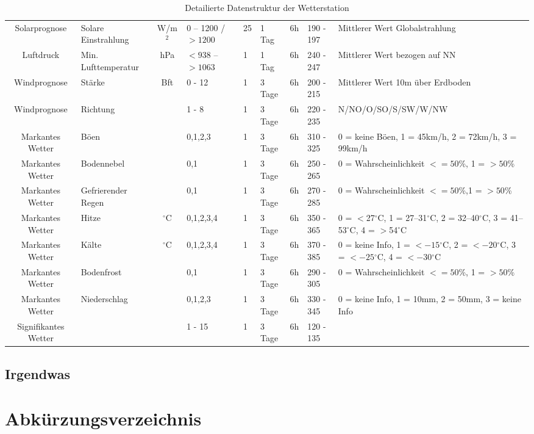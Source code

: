 \begin{sidewaystable}[h]
{{\begin{tabular}{| c | l | c | l | l | l | l | l | l |}
Solarprognose & Solare Einstrahlung & W/m$^2$ &  0 – 1200 / $>1200$ & 25 & 1 Tag & 6h & 190 - 197 & Mittlerer Wert Globalstrahlung\\
Luftdruck & Min. Lufttemperatur & hPa &  $<938$ – $>1063$ & 1 & 1 Tag & 6h & 240 - 247 & Mittlerer Wert bezogen auf NN\\
Windprognose & Stärke & Bft &  0 - 12 & 1 & 3 Tage & 6h & 200 - 215 & Mittlerer Wert 10m über Erdboden\\
Windprognose & Richtung &  &  1 - 8 & 1 & 3 Tage & 6h & 220 - 235 & N/NO/O/SO/S/SW/W/NW\\
Markantes Wetter & Böen &  &  0,1,2,3 & 1 & 3 Tage & 6h & 310 - 325 & 0 = keine Böen, 1 = 45km/h, 2 = 72km/h, 3 = 99km/h \\
Markantes Wetter & Bodennebel &  & 0,1 & 1 & 3 Tage & 6h & 250 - 265 & 0 = Wahrscheinlichkeit $<=50$\%, 1 = $>50$\%\\
Markantes Wetter & Gefrierender Regen &  & 0,1 & 1 & 3 Tage & 6h & 270 - 285 & 0 = Wahrscheinlichkeit $<= 50$\%,1 = $>50$\%\\
Markantes Wetter & Hitze & $^\circ$C &  0,1,2,3,4 & 1 & 3 Tage & 6h & 350 - 365 & 0 = $<$27$^\circ$C, 1 = 27–31$^\circ$C, 2 = 32–40$^\circ$C, 3 = 41–53$^\circ$C, 4 = $>$54$^\circ$C\\
Markantes Wetter & Kälte & $^\circ$C &  0,1,2,3,4 & 1 & 3 Tage & 6h & 370 - 385 & 0 = keine Info, 1 = $<-15$$^\circ$C, 2 = $<-20$$^\circ$C, 3 = $<-25$$^\circ$C, 4 = $<-30$$^\circ$C\\
Markantes Wetter & Bodenfrost &  &  0,1 & 1 & 3 Tage & 6h & 290 - 305 & 0 = Wahrscheinlichkeit $<= 50$\%, 1 = $>50$\%\\
Markantes Wetter & Niederschlag &  &  0,1,2,3 & 1 & 3 Tage & 6h & 330 - 345 & 0 = keine Info, 1 = 10mm, 2 = 50mm, 3 = keine Info\\
Signifikantes Wetter &  &  & 1 - 15 & 1 & 3 Tage & 6h & 120 - 135 &  \\
\hline
\end{tabular}
}
}
\caption{Detailierte Datenstruktur der Wetterstation\cite[S. 17-26]{HKWDoc}}
\label{tab:detaildatenstruktur}

\end{sidewaystable}
\section{Irgendwas} 
\chapter{Abkürzungsverzeichnis}

